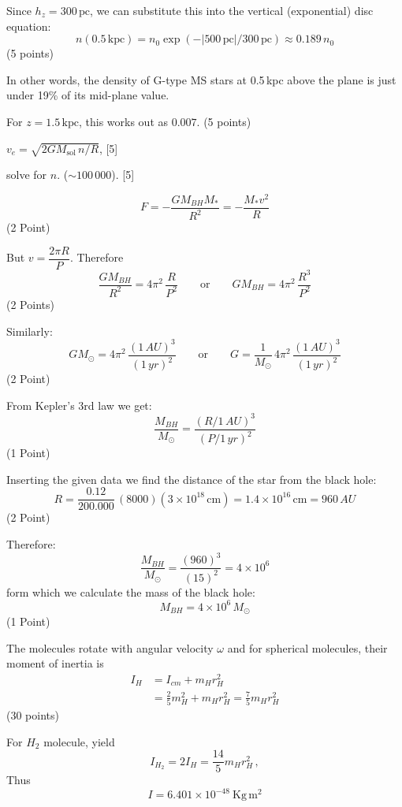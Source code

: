 Since $h_z = 300\,\mathrm{pc}$, we can substitute this into the vertical
(exponential) disc equation:
\[
  n(0.5\,\mathrm{kpc}) = n_0 \exp(-\left|500\,\mathrm{pc}\right|/300\,\mathrm{pc})
  \approx 0.189\,n_0
\]
\hfill(5 points)

In other words, the density of G-type MS stars at 0.5\,kpc above the plane is
just under 19\% of its mid-plane value.

For $z = 1.5\,\mathrm{kpc}$, this works out as $0.007$. \hfill(5 points)

$v_e = \sqrt{2GM_{\mathrm{sol}}\,n/R}$, \hfill[5]

solve for $n$. ($\sim 100\,000$). \hfill[5]

\[
  F = -\frac{GM_{BH}M_*}{R^2} = -\frac{M_*v^2}{R}
\]
\hfill(2 Point)

But $v = \dfrac{2\pi R}{P}$. Therefore
\[
  \frac{GM_{BH}}{R^2} = 4\pi^2\,\frac{R}{P^2}
  \qquad\text{or}\qquad
  GM_{BH} = 4\pi^2\,\frac{R^3}{P^2}
\]
\hfill(2 Points)

Similarly:
\[
  GM_\odot = 4\pi^2\,\frac{(1\,AU)^3}{(1\,yr)^2}
  \qquad\text{or}\qquad
  G = \frac{1}{M_\odot}\,4\pi^2\,\frac{(1\,AU)^3}{(1\,yr)^2}
\]
\hfill(2 Point)

From Kepler's 3rd law we get:
\[
  \frac{M_{BH}}{M_\odot} = \frac{(R/1\,AU)^3}{(P/1\,yr)^2}
\]
\hfill(1 Point)

Inserting the given data we find the distance of the star from the black hole:
\[
  R = \frac{0.12}{200.000}\,(8000)(3\times10^{18}\,\mathrm{cm})
    = 1.4\times10^{16}\,\mathrm{cm} = 960\,AU
\]
\hfill(2 Point)

Therefore:
\[
  \frac{M_{BH}}{M_\odot} = \frac{(960)^3}{(15)^2} = 4\times10^{6}
\]
form which %
we calculate the mass of the black hole:
\[
  M_{BH} = 4\times10^{6}\,M_\odot
\]
\hfill(1 Point)

The molecules rotate with angular velocity $\omega$ and for spherical
molecules, their moment of inertia is
\begin{align*}
  I_H &= I_{cm} + m_H r_H^2\\
      &= \frac{2}{5}m_H^2 + m_H r_H^2 = \frac{7}{5}m_H r_H^2
\end{align*}
\hfill(30 points)

For $H_2$ molecule, yield
\[
  I_{H_2} = 2I_H = \frac{14}{5}m_H r_H^2\,,
\]
Thus
\[
  I = 6.401\times10^{-48}\ \mathrm{Kg\,m^2}
\]

